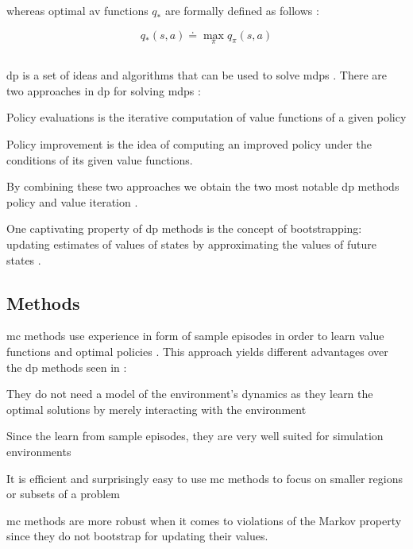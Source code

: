 \documentclass{seal_thesis}
\begin{document}
whereas optimal \gls{av} functions $q_*$ are formally defined as follows \cite[p. 74]{Sutton2017}:

\begin{equation}
	q_* (s,a) \doteq \max_\pi q_\pi (s,a)
\end{equation}

\subsection{}
\label{subsec:dp}

\gls{dp} is a set of ideas and algorithms that can be used to solve \glspl{mdp} \cite[p. 95]{Sutton2017}. There are two approaches in \gls{dp} for solving \glspl{mdp} \cite[p. 95]{Sutton2017}:
\begin{enumerate*}
	\item Policy evaluations is the iterative computation of value functions of a given policy
	\item Policy improvement is the idea of computing an improved policy under the conditions of its given value functions.
\end{enumerate*}

By combining these two approaches we obtain the two most notable \gls{dp} methods \ie policy and value iteration \cite[p. 95]{Sutton2017}.

One captivating property of \gls{dp} methods is the concept of bootstrapping: updating estimates of values of states by approximating the values of future states \cite[p. 96]{Sutton2017}.

\subsection{ Methods}
\label{subsec:mc}

\gls{mc} methods use experience in form of sample episodes in order to learn value functions and optimal policies \cite[p. 123]{Sutton2017}. This approach yields different advantages over the \gls{dp} methods seen in  \cite[p. 123]{Sutton2017}:
\begin{enumerate*}
	\item They do not need a model of the environment's dynamics as they learn the optimal solutions by merely interacting with the environment
	\item Since the learn from sample episodes, they are very well suited for simulation environments
	\item It is efficient and surprisingly easy to use \gls{mc} methods to focus on smaller regions or subsets of a problem
	\item \gls{mc} methods are more robust when it comes to violations of the Markov property since they do not bootstrap for updating their values.
\end{enumerate*}
\end{document}
